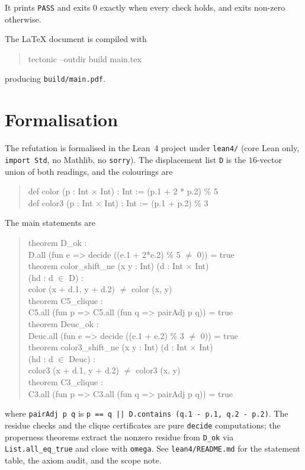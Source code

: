 \documentclass[11pt]{article}
\theoremstyle{definition}
\theoremstyle{remark}
\begin{document}
It prints \texttt{PASS} and exits $0$ exactly when every check holds, and exits
non-zero otherwise.

The LaTeX document is compiled with
\begin{quote}\ttfamily
tectonic --outdir build main.tex
\end{quote}
producing \texttt{build/main.pdf}.

\section{Formalisation}

The refutation is formalised in the Lean~4 project under \texttt{lean4/}
(core Lean only, \texttt{import Std}, no Mathlib, no \texttt{sorry}). The
displacement list \texttt{D} is the $16$-vector union of both readings, and the
colourings are
\begin{quote}\ttfamily
def color  (p : Int \(\times\) Int) : Int := (p.1 + 2 * p.2) \% 5\\
def color3 (p : Int \(\times\) Int) : Int := (p.1 + p.2) \% 3
\end{quote}
The main statements are
\begin{quote}\ttfamily
theorem D\_ok :\\
\hspace*{2em}D.all (fun e => decide ((e.1 + 2*e.2) \% 5 \(\ne\) 0)) = true\\
theorem color\_shift\_ne (x y : Int) (d : Int \(\times\) Int)\\
\hspace*{2em}(hd : d \(\in\) D) :\\
\hspace*{4em}color (x + d.1, y + d.2) \(\ne\) color (x, y)\\
theorem C5\_clique :\\
\hspace*{2em}C5.all (fun p => C5.all (fun q => pairAdj p q)) = true\\
theorem Deuc\_ok :\\
\hspace*{2em}Deuc.all (fun e => decide ((e.1 + e.2) \% 3 \(\ne\) 0)) = true\\
theorem color3\_shift\_ne (x y : Int) (d : Int \(\times\) Int)\\
\hspace*{2em}(hd : d \(\in\) Deuc) :\\
\hspace*{4em}color3 (x + d.1, y + d.2) \(\ne\) color3 (x, y)\\
theorem C3\_clique :\\
\hspace*{2em}C3.all (fun p => C3.all (fun q => pairAdj p q)) = true
\end{quote}
where \texttt{pairAdj p q} is \texttt{p == q || D.contains (q.1 - p.1, q.2 - p.2)}.
The residue checks and the clique certificates are pure \texttt{decide}
computations; the properness theorems extract the nonzero residue from
\texttt{D\_ok} via \texttt{List.all\_eq\_true} and close with \texttt{omega}.
See \texttt{lean4/README.md} for the statement table, the axiom audit, and the
scope note.
\end{document}
